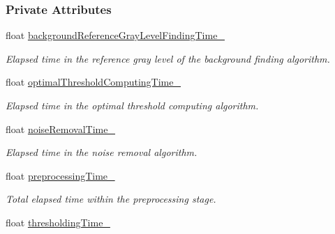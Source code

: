 \subsubsection*{Private Attributes}
\begin{CompactItemize}
\item 
\hypertarget{class_statistics_25e0a97191d0c5f1d4ad5df132f3b1cb}{
float \hyperlink{class_statistics_25e0a97191d0c5f1d4ad5df132f3b1cb}{backgroundReferenceGrayLevelFindingTime\_\-}}
\label{class_statistics_25e0a97191d0c5f1d4ad5df132f3b1cb}

\begin{CompactList}\small\item\em Elapsed time in the reference gray level of the background finding algorithm. \item\end{CompactList}\item 
\hypertarget{class_statistics_62f53a6e46b95f69399aeacd9633cede}{
float \hyperlink{class_statistics_62f53a6e46b95f69399aeacd9633cede}{optimalThresholdComputingTime\_\-}}
\label{class_statistics_62f53a6e46b95f69399aeacd9633cede}

\begin{CompactList}\small\item\em Elapsed time in the optimal threshold computing algorithm. \item\end{CompactList}\item 
\hypertarget{class_statistics_1894a0ccc215b0860b826e9fa28f4f32}{
float \hyperlink{class_statistics_1894a0ccc215b0860b826e9fa28f4f32}{noiseRemovalTime\_\-}}
\label{class_statistics_1894a0ccc215b0860b826e9fa28f4f32}

\begin{CompactList}\small\item\em Elapsed time in the noise removal algorithm. \item\end{CompactList}\item 
\hypertarget{class_statistics_2f2aef5727e7fac5685a1db6d03b1c99}{
float \hyperlink{class_statistics_2f2aef5727e7fac5685a1db6d03b1c99}{preprocessingTime\_\-}}
\label{class_statistics_2f2aef5727e7fac5685a1db6d03b1c99}

\begin{CompactList}\small\item\em Total elapsed time within the preprocessing stage. \item\end{CompactList}\item 
\hypertarget{class_statistics_2c3c6c2160764632a5a7123682698010}{
float \hyperlink{class_statistics_2c3c6c2160764632a5a7123682698010}{thresholdingTime\_\-}}
\label{class_statistics_2c3c6c2160764632a5a7123682698010}


\end{CompactItemize}
